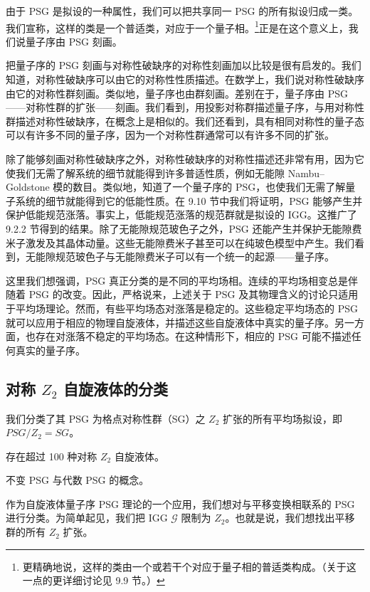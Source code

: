 由于 PSG 是拟设的一种属性，我们可以把共享同一 PSG 的所有拟设归成一类。我们宣称，这样的类是一个普适类，对应于一个量子相。\footnote{更精确地说，这样的类由一个或若干个对应于量子相的普适类构成。（关于这一点的更详细讨论见 9.9 节。）}正是在这个意义上，我们说量子序由 PSG 刻画。

把量子序的 PSG 刻画与对称性破缺序的对称性刻画加以比较是很有启发的。我们知道，对称性破缺序可以由它的对称性性质描述。在数学上，我们说对称性破缺序由它的对称性群刻画。类似地，量子序也由群刻画。差别在于，量子序由 PSG——对称性群的扩张——刻画。我们看到，用投影对称群描述量子序，与用对称性群描述对称性破缺序，在概念上是相似的。我们还看到，具有相同对称性的量子态可以有许多不同的量子序，因为一个对称性群通常可以有许多不同的扩张。

除了能够刻画对称性破缺序之外，对称性破缺序的对称性描述还非常有用，因为它使我们无需了解系统的细节就能得到许多普适性质，例如无能隙 Nambu--Goldstone 模的数目。类似地，知道了一个量子序的 PSG，也使我们无需了解量子系统的细节就能得到它的低能性质。在 9.10 节中我们将证明，PSG 能够产生并保护低能规范涨落。事实上，低能规范涨落的规范群就是拟设的 IGG。这推广了 9.2.2 节得到的结果。除了无能隙规范玻色子之外，PSG 还能产生并保护无能隙费米子激发及其晶体动量。这些无能隙费米子甚至可以在纯玻色模型中产生。我们看到，无能隙规范玻色子与无能隙费米子可以有一个统一的起源——量子序。

这里我们想强调，PSG 真正分类的是不同的平均场相。连续的平均场相变总是伴随着 PSG 的改变。因此，严格说来，上述关于 PSG 及其物理含义的讨论只适用于平均场理论。然而，有些平均场态对涨落是稳定的。这些稳定平均场态的 PSG 就可以应用于相应的物理自旋液体，并描述这些自旋液体中真实的量子序。另一方面，也存在对涨落不稳定的平均场态。在这种情形下，相应的 PSG 可能不描述任何真实的量子序。

\subsection{对称 $Z_2$ 自旋液体的分类}

\begin{keypoints}
\item 我们分类了其 PSG 为格点对称性群（SG）之 $Z_2$ 扩张的所有平均场拟设，即 $PSG/Z_2=SG$。
\item 存在超过 100 种对称 $Z_2$ 自旋液体。
\item 不变 PSG 与代数 PSG 的概念。
\end{keypoints}

作为自旋液体量子序 PSG 理论的一个应用，我们想对与平移变换相联系的 PSG 进行分类。为简单起见，我们把 IGG $\mathcal{G}$ 限制为 $Z_2$。也就是说，我们想找出平移群的所有 $Z_2$ 扩张。

